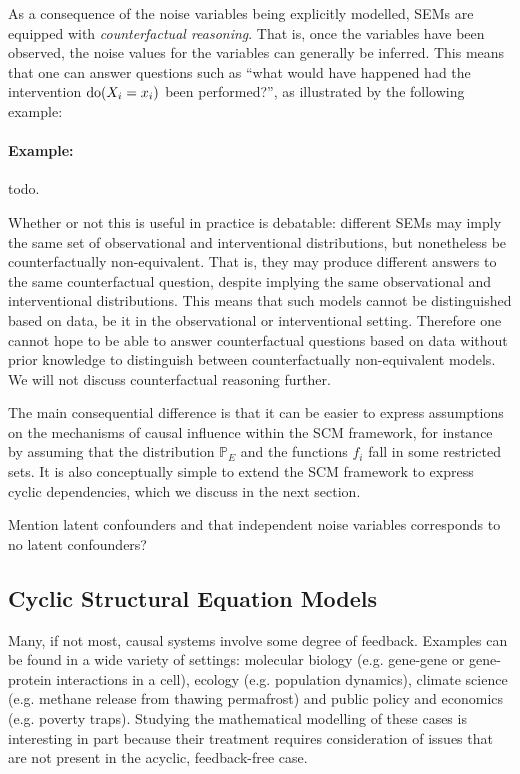 As a consequence of the noise variables being explicitly modelled, SEMs are equipped with \emph{counterfactual reasoning}. That is, once the variables have been observed, the noise values for the variables can generally be inferred. This means that one can answer questions such as ``what would have happened had the intervention $\operatorname{do}(X_i=x_i)$ been performed?'', as illustrated by the following example:

\paragraph{Example:} todo.

Whether or not this is useful in practice is debatable: different SEMs may imply the same set of observational and interventional distributions, but nonetheless be counterfactually non-equivalent. That is, they may produce different answers to the same counterfactual question, despite implying the same observational and interventional distributions. This means that such models cannot be distinguished based on data, be it in the observational or interventional setting. Therefore one cannot hope to be able to answer counterfactual questions based on data without prior knowledge to distinguish between counterfactually non-equivalent models.
We will not discuss counterfactual reasoning further.


The main consequential difference is that it can be easier to express assumptions on the mechanisms of causal influence within the SCM framework, for instance by assuming that the distribution $\mathbb{P}_E$ and the functions $f_i$ fall in some restricted sets.
It is also conceptually simple to extend the SCM framework to express cyclic dependencies, which we discuss in the next section.


Mention latent confounders and that independent noise variables corresponds to no latent confounders?

\subsection{Cyclic Structural Equation Models}

Many, if not most, causal systems involve some degree of feedback. 
Examples can be found in a wide variety of settings: molecular biology (e.g. gene-gene or gene-protein interactions in a cell), ecology (e.g. population dynamics), climate science (e.g. methane release from thawing permafrost) and public policy and economics (e.g. poverty traps).
Studying the mathematical modelling of these cases is interesting in part because their treatment requires consideration of issues that are not present in the acyclic, feedback-free case.

